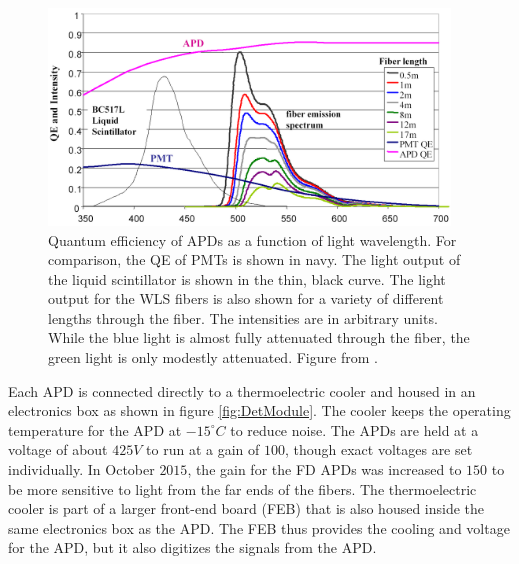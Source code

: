 \begin{figure}[htb]
  \centering
  \includegraphics[width=0.95\textwidth]{figures/APDvsPMT.png}
  \caption[Quantum Efficiency of APDs and Light Intensity Output of WLS fibers]{Quantum efficiency of APDs as a function of light wavelength. For comparison, the QE of PMTs is shown in navy. The light output of the liquid scintillator is shown in the thin, black curve. The light output for the WLS fibers is also shown for a variety of different lengths through the fiber. The intensities are in arbitrary units. While the blue light is almost fully attenuated through the fiber, the green light is only modestly attenuated. Figure from \cite{ref:TDRNOvA}.}
  \label{fig:APDvsPMT}
\end{figure}

Each APD is connected directly to a thermoelectric cooler and housed in an electronics box as shown in figure \ref{fig:DetModule}. The cooler keeps the operating temperature for the APD at $-15^\circ\unit{C}$ to reduce noise. The APDs are held at a voltage of about $425\unit{V}$ to run at a gain of $100$, though exact voltages are set individually. In October $2015$, the gain for the FD APDs was increased to $150$ to be more sensitive to light from the far ends of the fibers. The thermoelectric cooler is part of a larger front-end board (FEB) that is also housed inside the same electronics box as the APD. The FEB thus provides the cooling and voltage for the APD, but it also digitizes the signals from the APD.

